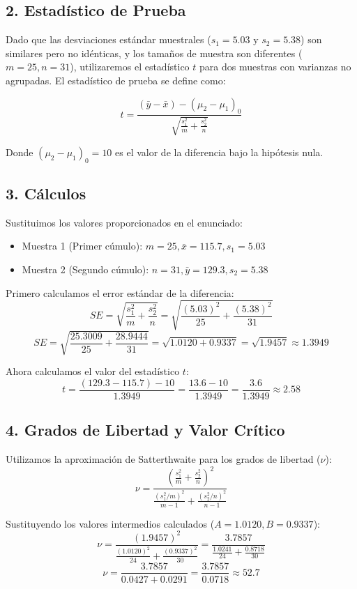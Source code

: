 \documentclass[12pt]{article}
\begin{document}
\subsection*{2. Estadístico de Prueba}

Dado que las desviaciones estándar muestrales ($s_1 = 5.03$ y $s_2 = 5.38$) son similares pero no idénticas, y los tamaños de muestra son diferentes ($m=25, n=31$), utilizaremos el estadístico $t$ para dos muestras con varianzas no agrupadas. El estadístico de prueba se define como:

$$ t = \frac{(\bar{y} - \bar{x}) - (\mu_2 - \mu_1)_0}{\sqrt{\frac{s_1^2}{m} + \frac{s_2^2}{n}}} $$

Donde $(\mu_2 - \mu_1)_0 = 10$ es el valor de la diferencia bajo la hipótesis nula.

\subsection*{3. Cálculos}

Sustituimos los valores proporcionados en el enunciado:
\begin{itemize}
    \item Muestra 1 (Primer cúmulo): $m = 25, \bar{x} = 115.7, s_1 = 5.03$
    \item Muestra 2 (Segundo cúmulo): $n = 31, \bar{y} = 129.3, s_2 = 5.38$
\end{itemize}

Primero calculamos el error estándar de la diferencia:
$$ SE = \sqrt{\frac{s_1^2}{m} + \frac{s_2^2}{n}} = \sqrt{\frac{(5.03)^2}{25} + \frac{(5.38)^2}{31}} $$
$$ SE = \sqrt{\frac{25.3009}{25} + \frac{28.9444}{31}} = \sqrt{1.0120 + 0.9337} = \sqrt{1.9457} \approx 1.3949 $$

Ahora calculamos el valor del estadístico $t$:
$$ t = \frac{(129.3 - 115.7) - 10}{1.3949} = \frac{13.6 - 10}{1.3949} = \frac{3.6}{1.3949} \approx 2.58 $$

\subsection*{4. Grados de Libertad y Valor Crítico}

Utilizamos la aproximación de Satterthwaite para los grados de libertad ($\nu$):
$$ \nu = \frac{\left( \frac{s_1^2}{m} + \frac{s_2^2}{n} \right)^2}{\frac{(s_1^2/m)^2}{m-1} + \frac{(s_2^2/n)^2}{n-1}} $$

Sustituyendo los valores intermedios calculados ($A = 1.0120, B = 0.9337$):
$$ \nu = \frac{(1.9457)^2}{\frac{(1.0120)^2}{24} + \frac{(0.9337)^2}{30}} = \frac{3.7857}{\frac{1.0241}{24} + \frac{0.8718}{30}} $$
$$ \nu = \frac{3.7857}{0.0427 + 0.0291} = \frac{3.7857}{0.0718} \approx 52.7 $$
\end{document}
